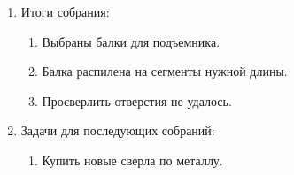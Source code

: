 \begin{enumerate}
\begin{enumerate}
\begin{enumerate}
      \end{enumerate}
      
    \end{enumerate}
    
	\item Итоги собрания: 
	\begin{enumerate}
	  \item Выбраны балки для подъемника.
	  
	  \item Балка распилена на сегменты нужной длины.
	  
	  \item Просверлить отверстия не удалось.
	   
    \end{enumerate}
    
	\item Задачи для последующих собраний:
	\begin{enumerate}
	  \item Купить новые сверла по металлу.
	  
    \end{enumerate}     
\end{enumerate}

\fillpage
